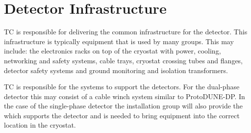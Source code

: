\section{Detector Infrastructure}
\label{sec:fdsp-coord-infrastructure}

TC is responsible for delivering the common infrastructure for the
detector. This infrastructure is typically equipment that is used by
many groups. This may include: the electronics racks on top of the
cryostat with power, cooling, networking and safety systems, cable
trays, cryostat crossing tubes and flanges, detector safety systems
and ground monitoring and isolation transformers.

TC is responsible for the systems to support the detectors. For the
dual-phase detector this may consist of a cable winch system similar
to ProtoDUNE-DP.  In the case of the single-phase detector the
installation group will also provide the  which supports
the detector and is needed to bring equipment into the correct
location in the cryostat.


